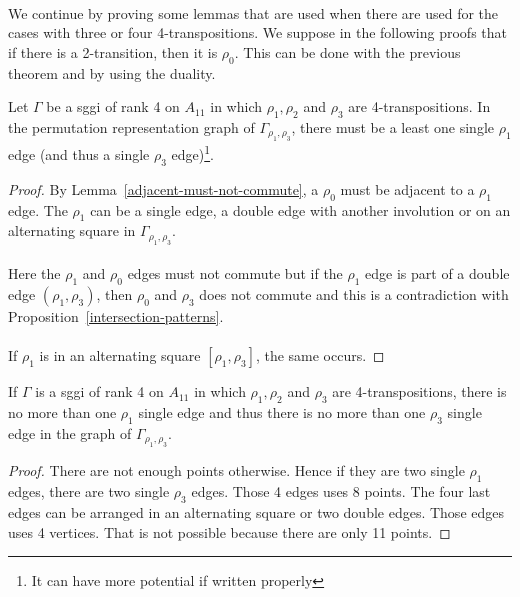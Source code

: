 \paragraph{}
We continue by proving some lemmas that are used when there are used for the cases with three or four 4-transpositions. We suppose in the following proofs that if there is a 2-transition, then it is $\rho_0$. This can be done with the previous theorem and by using the duality.

\begin{lemma}
  Let $\Gamma$ be a sggi of rank 4 on $A_{11}$ in which $\rho_1, \rho_2$ and $\rho_3$ are 4-transpositions. In the permutation representation graph of $\Gamma_{\rho_1, \rho_3}$, there must be a least one single $\rho_1$ edge (and thus a single $\rho_3$ edge)\footnote{It can have more potential if written properly}.
\end{lemma}

\begin{proof}
  By Lemma~\ref{adjacent-must-not-commute}, a $\rho_0$ must be adjacent to a $\rho_1$ edge. The $\rho_1$ can be a single edge, a double edge with another involution or on an alternating square in $\Gamma_{\rho_1, \rho_3}$.

  \paragraph{}
  Here the $\rho_1$ and $\rho_0$ edges must not commute but if the $\rho_1$ edge is part of a double edge $(\rho_1, \rho_3)$, then $\rho_0$ and $\rho_3$ does not commute and this is a contradiction with Proposition~\ref{intersection-patterns}.

  \paragraph{}
  If $\rho_1$ is in an alternating square $[\rho_1, \rho_3]$, the same occurs.

\end{proof}

\begin{lemma}
    If $\Gamma$ is a sggi of rank 4 on $A_{11}$ in which $\rho_1, \rho_2$ and $\rho_3$ are 4-transpositions, there is no more than one $\rho_1$ single edge and thus there is no more than one $\rho_3$ single edge in the graph of $\Gamma_{\rho_1, \rho_3}$.
\end{lemma}

\begin{proof}
  There are not enough points otherwise. Hence if they are two single $\rho_1$ edges, there are two single $\rho_3$ edges. Those 4 edges uses 8 points. The four last edges can be arranged in an alternating square or two double edges. Those edges uses 4 vertices. That is not possible because there are only 11 points.
\end{proof}

